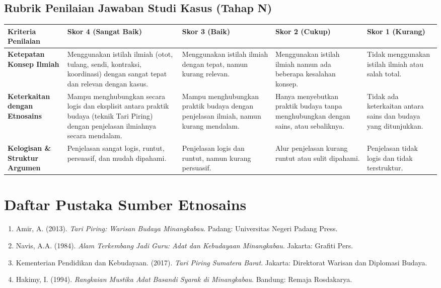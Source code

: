 \documentclass[a4paper,12pt]{article}
\begin{document}
\subsection{Rubrik Penilaian Jawaban Studi Kasus (Tahap N)}

\begin{longtable}{|p{3cm}|p{3cm}|p{3cm}|p{3cm}|p{3cm}|}
\hline
\textbf{Kriteria Penilaian} & \textbf{Skor 4 (Sangat Baik)} & \textbf{Skor 3 (Baik)} & \textbf{Skor 2 (Cukup)} & \textbf{Skor 1 (Kurang)} \\
\hline
\textbf{Ketepatan Konsep Ilmiah} & Menggunakan istilah ilmiah (otot, tulang, sendi, kontraksi, koordinasi) dengan sangat tepat dan relevan dengan kasus. & Menggunakan istilah ilmiah dengan tepat, namun kurang relevan. & Menggunakan istilah ilmiah namun ada beberapa kesalahan konsep. & Tidak menggunakan istilah ilmiah atau salah total. \\
\hline
\textbf{Keterkaitan dengan Etnosains} & Mampu menghubungkan secara logis dan eksplisit antara praktik budaya (teknik Tari Piring) dengan penjelasan ilmiahnya secara mendalam. & Mampu menghubungkan praktik budaya dengan penjelasan ilmiah, namun kurang mendalam. & Hanya menyebutkan praktik budaya tanpa menghubungkan dengan sains, atau sebaliknya. & Tidak ada keterkaitan antara sains dan budaya yang ditunjukkan. \\
\hline
\textbf{Kelogisan \& Struktur Argumen} & Penjelasan sangat logis, runtut, persuasif, dan mudah dipahami. & Penjelasan logis dan runtut, namun kurang persuasif. & Alur penjelasan kurang runtut atau sulit dipahami. & Penjelasan tidak logis dan tidak terstruktur. \\
\hline
\end{longtable}

\section{Daftar Pustaka Sumber Etnosains}

\begin{enumerate}
\item Amir, A. (2013). \textit{Tari Piring: Warisan Budaya Minangkabau}. Padang: Universitas Negeri Padang Press.
\item Navis, A.A. (1984). \textit{Alam Terkembang Jadi Guru: Adat dan Kebudayaan Minangkabau}. Jakarta: Grafiti Pers.
\item Kementerian Pendidikan dan Kebudayaan. (2017). \textit{Tari Piring Sumatera Barat}. Jakarta: Direktorat Warisan dan Diplomasi Budaya.
\item Hakimy, I. (1994). \textit{Rangkaian Mustika Adat Basandi Syarak di Minangkabau}. Bandung: Remaja Rosdakarya.
\end{enumerate}
\end{document}
